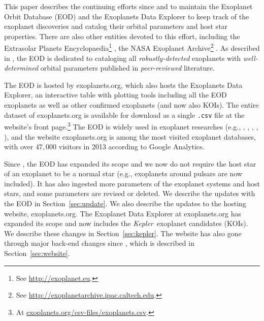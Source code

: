 \documentclass[11pt,preprint]{aastex}
\def\kepler{\textit{Kepler}}
\begin{document}
\begin{CJK*}{UTF8}{gbsn}
This paper describes the continuing efforts since \cite{Butler2006}
and \cite{Wright2011} to maintain the Exoplanet Orbit Database (EOD)
and the Exoplanets Data Explorer to keep track of the exoplanet
discoveries and catalog their orbital parameters and host star
properties. There are also other entities devoted to this effort,
including the Extrasolar Planets Encyclopaedia\footnote{See
  \url{http://exoplanet.eu}.}  \citep{Schneider2011}, the NASA
Exoplanet Archive\footnote{See
  \url{http://exoplanetarchive.ipac.caltech.edu}.}
\citep{Akeson2013}. As described in \cite{Wright2011}, the EOD is
dedicated to cataloging all \emph{robustly-detected} exoplanets with
\emph{well-determined} orbital parameters published in
\emph{peer-reviewed} literature.

The EOD is hosted by exoplanets.org, which also hosts the Exoplanets
Data Explorer, an interactive table with plotting tools including all
the EOD exoplanets as well as other confirmed exoplanets (and now also
KOIs). The entire dataset of exoplanets.org is available for download
as a single {\tt .csv} file at the website's front page.\footnote{At
  \url{exoplanets.org/csv-files/exoplanets.csv}.} The EOD is widely
used in exoplanet researches (e.g., \citealt{Dawson2013},
\citealt{Howard2013}, \citealt{Kipping2013}, \citealt{Kane2014},
\citealt{Weiss2014}), and the website exoplanets.org is among the most
visited exoplanet databases, with over $47,000$ visitors in 2013
according to Google Analytics.

Since \cite{Wright2011}, the EOD has expanded its scope and we now do
not require the host star of an exoplanet to be a normal star (e.g.,
exoplanets around pulsars are now included). It has also ingested more
parameters of the exoplanet systems and host stars, and some
parameters are revised or deleted. We describe the updates with the
EOD in Section~\ref{sec:update}. We also describe the updates to the
hosting website, exoplanets.org. The Exoplanet Data Explorer at
exoplanets.org has expanded its scope and now includes the
\kepler\ exoplanet candidates (KOIs). We describe these changes in
Section~\ref{sec:kepler}. The website has also gone through major
back-end changes since \cite{Wright2011}, which is described in
Section~\ref{sec:website}.

\begin{comment}
Since the first peer-reviewed list of exoplanets with robust orbits
\citep{Butler2002,Butler2006}, the count of exoplanets has increased
from less than 200 to over 1490 as of March 2014
(exoplanets.org). Before the launch of NASA's \kepler\ mission
\citep{Borucki2010}, most confirmed exoplanets were discovered via the
precise radial velocity (RV) method. However, since 2009, \kepler\ has
contributed over $\sim$ 800 confirmed exoplanets (e.g.,
\ciatealt{Marcy2014}, \citealt{Rowe2014}) as well as over 3000
exoplanet candidates (\kepler\ Objects of Interest, KOIs;
e.g.~\citealt{Batalha2013}).


\end{comment}
\end{CJK*}
\end{document}
